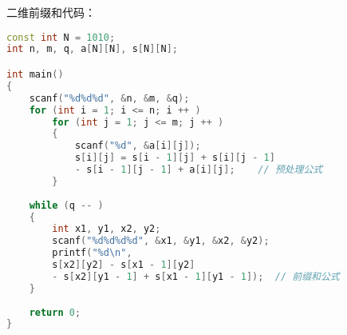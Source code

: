 二维前缀和代码：

\begin{lstlisting}[language=cpp]
const int N = 1010;
int n, m, q, a[N][N], s[N][N];

int main()
{
    scanf("%d%d%d", &n, &m, &q);
    for (int i = 1; i <= n; i ++ )
        for (int j = 1; j <= m; j ++ )
        {
            scanf("%d", &a[i][j]);
            s[i][j] = s[i - 1][j] + s[i][j - 1] 
            - s[i - 1][j - 1] + a[i][j];    // 预处理公式
        }
        
    while (q -- )
    {
        int x1, y1, x2, y2;
        scanf("%d%d%d%d", &x1, &y1, &x2, &y2);
        printf("%d\n", 
        s[x2][y2] - s[x1 - 1][y2] 
        - s[x2][y1 - 1] + s[x1 - 1][y1 - 1]);  // 前缀和公式
    }
    
    return 0;
}
\end{lstlisting}